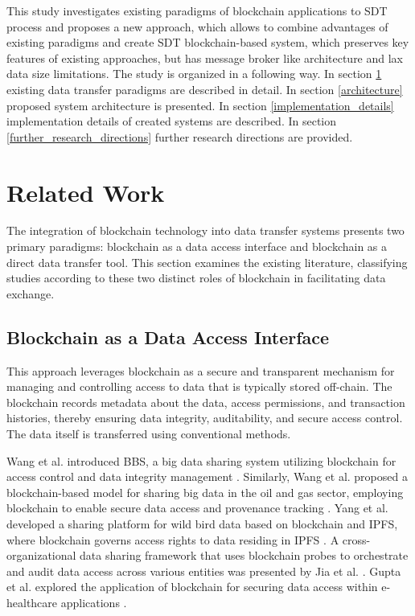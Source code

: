 \documentclass[10pt]{llncs}
\begin{document}
This study investigates existing paradigms of blockchain applications to SDT process and proposes a new approach, which allows to combine advantages of existing paradigms and create 
SDT blockchain-based system, which preserves key features of existing approaches, but has message broker like architecture and lax data size limitations.
The study is organized in a following way. 
In section \ref{related_work} existing data transfer paradigms are described in detail.
In section \ref{architecture} proposed system architecture is presented.
In section \ref{implementation_details} implementation details of created systems are described.
In section \ref{further_research_directions} further research directions are provided.

\section{Related Work} \label{related_work}

The integration of blockchain technology into data transfer systems presents two primary paradigms: blockchain as a data access interface and blockchain as a direct data transfer tool. 
This section examines the existing literature, classifying studies according to these two distinct roles of blockchain in facilitating data exchange.

\subsection{Blockchain as a Data Access Interface}

This approach leverages blockchain as a secure and transparent mechanism for managing and controlling access to data that is typically stored off-chain. 
The blockchain records metadata about the data, access permissions, and transaction histories, thereby ensuring data integrity, auditability, and 
secure access control. 
The data itself is transferred using conventional methods.

Wang et al. introduced BBS, a big data sharing system utilizing blockchain for access control and data integrity management \cite{Wang2024}. 
Similarly, Wang et al. proposed a blockchain-based model for sharing big data in the oil and gas sector, employing blockchain to enable secure data 
access and provenance tracking \cite{WangYY2021}. 
Yang et al. developed a sharing platform for wild bird data based on blockchain and IPFS, where blockchain governs access rights to data residing in IPFS \cite{Yang2022}. 
A cross-organizational data sharing framework that uses blockchain probes to orchestrate and audit data access across various entities was presented by Jia et al. \cite{Jia2023}. 
Gupta et al. explored the application of blockchain for securing data access within e-healthcare applications \cite{Gupta2022}.
\end{document}
